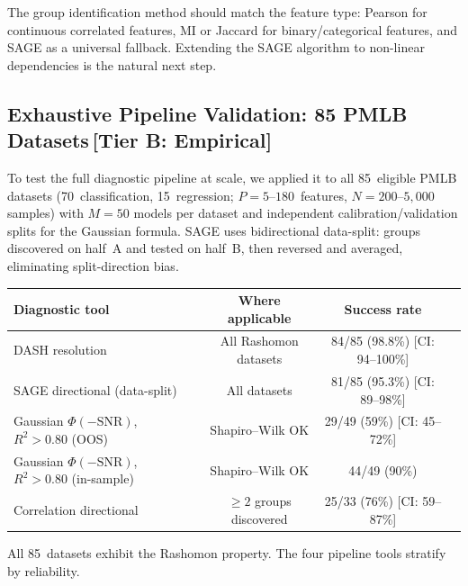 \documentclass[11pt,a4paper]{article}
\begin{document}
The group identification method should match the feature type: Pearson for continuous correlated features, MI or Jaccard for binary/categorical features, and SAGE as a universal fallback. Extending the SAGE algorithm to non-linear dependencies is the natural next step.

\subsection{Exhaustive Pipeline Validation: 85 PMLB Datasets\,\textnormal{\normalsize[Tier B: Empirical]}}
\label{sec:massive-validation}

To test the full diagnostic pipeline at scale, we applied it to all
85~eligible PMLB datasets (70~classification, 15~regression;
$P = 5$--$180$~features, $N = 200$--$5{,}000$ samples) with $M = 50$
models per dataset and independent calibration/validation splits for
the Gaussian formula.  SAGE uses bidirectional data-split: groups
discovered on half~A and tested on half~B, then reversed and averaged,
eliminating split-direction bias.

\begin{center}
\small
\begin{tabular}{lccc}
\toprule
Diagnostic tool & Where applicable & Success rate \\
\midrule
DASH resolution & All Rashomon datasets & 84/85 (98.8\%) [CI: 94--100\%] \\
SAGE directional (data-split) & All datasets & 81/85 (95.3\%) [CI: 89--98\%] \\
Gaussian $\Phi(-\text{SNR})$, $R^2 > 0.80$ (OOS) & Shapiro--Wilk OK & 29/49 (59\%) [CI: 45--72\%] \\
Gaussian $\Phi(-\text{SNR})$, $R^2 > 0.80$ (in-sample) & Shapiro--Wilk OK & 44/49 (90\%) \\
Correlation directional & $\geq 2$ groups discovered & 25/33 (76\%) [CI: 59--87\%] \\
\bottomrule
\end{tabular}
\end{center}

All 85~datasets exhibit the Rashomon property.  The four pipeline tools
stratify by reliability.
\end{document}

